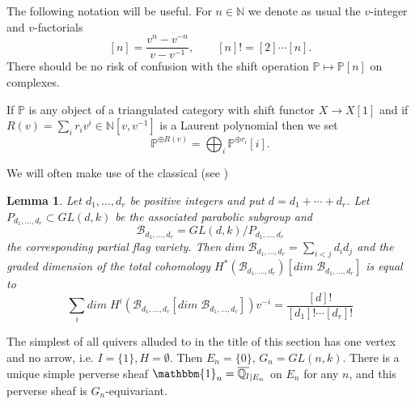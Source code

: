 \documentclass[a4paper,10pt]{amsart}
\def\N{\mathbb{N}}
\def\qlb{\overline{\mathbb{Q}_l}}
\newtheorem{lem}[theo]{Lemma}
\numberwithin{equation}{section}
\begin{document}
\vspace{.15in}

The following notation will be useful. For $n \in \N$ we denote as usual the $v$-integer and $v$-factorials
$$[n]=\frac{v^n-v^{-n}}{v-v^{-1}}, \qquad [n]!=[2] \cdots [n].$$
There should be no risk of confusion with the shift operation $\mathbb{P} \mapsto \mathbb{P}[n]$ on complexes.

\vspace{.1in}

If $\mathbb{P}$ is any object of a triangulated category with shift functor $X \to X[1]$ and if $R(v)=\sum_i r_i v^i \in \N[v,v^{-1}]$ is a Laurent polynomial then we set
$$\mathbb{P}^{\oplus R(v)}=\bigoplus_i \mathbb{P}^{\oplus r_i}[i].$$

We will often make use of the classical (see \cite{Hiller})

\begin{lem}\label{L:21}Let $d_1, \ldots, d_r$ be positive integers and put $d=d_1 + \cdots + d_r$. Let $P_{d_1, \ldots, d_r} \subset GL(d,k)$ be the associated parabolic subgroup and 
$$\mathcal{B}_{d_1, \ldots, d_r}=GL(d,k)/P_{d_1, \ldots, d_r}$$ 
the corresponding partial flag variety. Then $dim\; \mathcal{B}_{d_1, \ldots, d_r}=\sum_{i <j} d_i d_j$ and the graded dimension of the total cohomology $H^*(\mathcal{B}_{d_1, \ldots, d_r})[dim\;\mathcal{B}_{d_1, \ldots,d_r}]$ is equal to
$$\sum_i dim\; H^i(\mathcal{B}_{d_1, \ldots, d_r}[dim\;\mathcal{B}_{d_1, \ldots,d_r}]) v^{-i}=\frac{[d]!}{[d_1]! \cdots [d_r]!}$$ 
\end{lem}

\vspace{.2in}

The simplest of all quivers alluded to in the title of this section has one vertex and no arrow, i.e. $I=\{1\}, H=\emptyset$. Then $E_n=\{0\}$, $G_n=GL(n,k)$. There is a unique simple perverse sheaf $\mathbbm{1}_{n}=\qlb_{|E_n}$ on $E_n$ for any $n$, and this perverse sheaf is $G_n$-equivariant.

\vspace{.1in}
\end{document}
